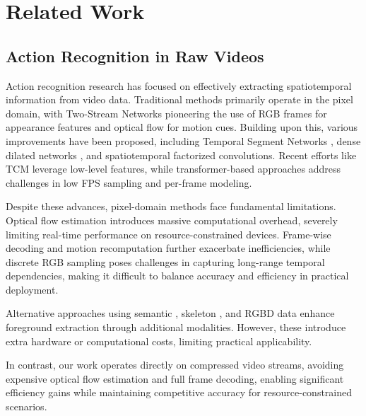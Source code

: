 \documentclass[letterpaper]{article} %
\begin{document}
\section{Related Work}
\label{sec:related_work}
\subsection{Action Recognition in Raw Videos}
Action recognition research has focused on effectively extracting spatiotemporal information from video data. Traditional methods primarily operate in the pixel domain, with Two-Stream Networks \cite{simonyan2014two} pioneering the use of RGB frames for appearance features and optical flow for motion cues. Building upon this, various improvements have been proposed, including Temporal Segment Networks \cite{wang2016temporal}, dense dilated networks \cite{xu2019dense}, and spatiotemporal factorized convolutions. Recent efforts like TCM \cite{liu2022motion} leverage low-level features, while transformer-based approaches \cite{piergiovanni2023rethinking} address challenges in low FPS sampling and per-frame modeling.

Despite these advances, pixel-domain methods face fundamental limitations. Optical flow estimation introduces massive computational overhead, severely limiting real-time performance on resource-constrained devices. Frame-wise decoding and motion recomputation further exacerbate inefficiencies, while discrete RGB sampling poses challenges in capturing long-range temporal dependencies, making it difficult to balance accuracy and efficiency in practical deployment.

Alternative approaches using semantic \cite{tu2019semantic,shen2022fexnet,luo2022dense}, skeleton \cite{tu2022joint,xiong2023human,liu2023novel,shu2023multi,xu2023spatiotemporal,xu2023pyramid}, and RGBD data \cite{cheng2022cross} enhance foreground extraction through additional modalities. However, these introduce extra hardware or computational costs, limiting practical applicability.

In contrast, our work operates directly on compressed video streams, avoiding expensive optical flow estimation and full frame decoding, enabling significant efficiency gains while maintaining competitive accuracy for resource-constrained scenarios.
\end{document}
